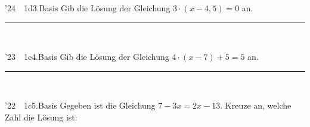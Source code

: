\documentclass[11pt]{article}
\def\gkopfnach{}
\newcommand{\gkopfvor}[1]{\gdef\gkopfnach{#1}}
\newcommand{\linie}[1]{\,{\color{black!45}\rule[-1pt]{#1}{0.4pt}}\,}
\newcommand{\pkt}{\textperiodcentered{}}
\begin{document}
\gkopfvor{\gbstvor{C}\pfstufekopf{Lösung gesucht}{\gpunkte[24 23 22]{\textcolor{black!25}{$\circ$}\,\textcolor{black!25}{$\circ$}\,\textcolor{black!80}{$\bullet$}\,\textcolor{black!80}{$\bullet$}\,\textcolor{black!80}{$\bullet$}}}\special{pdf:dest (stufe-losung-gesucht) [@thispage /XYZ @xpos @ypos null]}}
\begin{pfaufg}{’24~\pkt{}~1d}{3.}{Basis}
Gib die Lösung der Gleichung $3 \cdot (x  -  4{,}5) = 0$ an.
\hfill\linie{30mm}
\end{pfaufg}
\begin{pfaufg}{’23~\pkt{}~1e}{4.}{Basis}
Gib die Lösung der Gleichung $4 \cdot (x  -  7) + 5 = 5$ an.
\hfill\linie{30mm}
\end{pfaufg}
\begin{pfaufg}{’22~\pkt{}~1c}{5.}{Basis}
Gegeben ist die Gleichung $7  -  3x = 2x  -  13$. Kreuze an, welche Zahl die Lösung ist:
\par\smallskip\noindent{}
\end{pfaufg}
\end{document}
